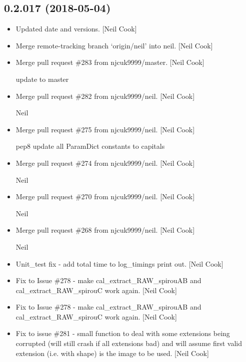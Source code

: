 \documentclass[a4paper,10pt,english]{report}
\begin{document}
\subsection{0.2.017 (2018-05-04)}
\label{\detokenize{misc/changelog:id442}}\begin{itemize}
\item {} 
Updated date and versions. {[}Neil Cook{]}

\item {} 
Merge remote-tracking branch ‘origin/neil’ into neil. {[}Neil Cook{]}

\item {} 
Merge pull request \#283 from njcuk9999/master. {[}Neil Cook{]}

update to master

\item {} 
Merge pull request \#282 from njcuk9999/neil. {[}Neil Cook{]}

Neil

\item {} 
Merge pull request \#275 from njcuk9999/neil. {[}Neil Cook{]}

pep8 update all ParamDict constants to capitals

\item {} 
Merge pull request \#274 from njcuk9999/neil. {[}Neil Cook{]}

Neil

\item {} 
Merge pull request \#270 from njcuk9999/neil. {[}Neil Cook{]}

Neil

\item {} 
Merge pull request \#268 from njcuk9999/neil. {[}Neil Cook{]}

Neil

\item {} 
Unit\_test fix - add total time to log\_timings print out. {[}Neil Cook{]}

\item {} 
Fix to Issue \#278 - make cal\_extract\_RAW\_spirouAB and
cal\_extract\_RAW\_spirouC work again. {[}Neil Cook{]}

\item {} 
Fix to Issue \#278 - make cal\_extract\_RAW\_spirouAB and
cal\_extract\_RAW\_spirouC work again. {[}Neil Cook{]}

\item {} 
Fix to issue \#281 - small function to deal with some extensions being
corrupted (will still crash if all extensions bad) and will assume
first valid extension (i.e. with shape) is the image to be used. {[}Neil
Cook{]}


\end{itemize}
\end{document}
